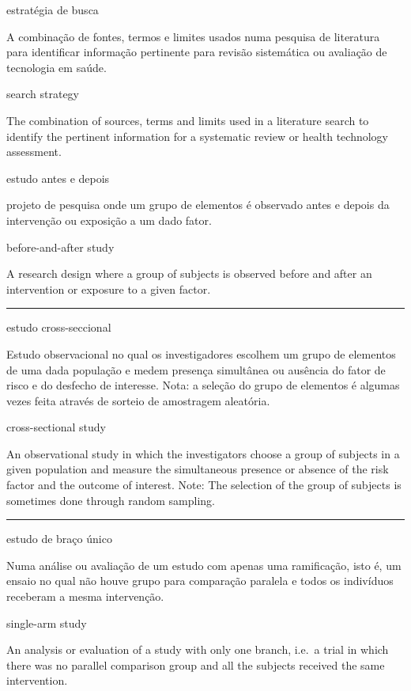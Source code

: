 \documentclass[
]{book}
\begin{document}
estratégia de busca

A combinação de fontes, termos e limites usados numa pesquisa de literatura para identificar informação pertinente para revisão sistemática ou avaliação de tecnologia em saúde.

search strategy

The combination of sources, terms and limits used in a literature search to identify the pertinent information for a systematic review or health technology assessment.

estudo antes e depois

projeto de pesquisa onde um grupo de elementos é observado antes e depois da intervenção ou exposição a um dado fator.

before-and-after study

A research design where a group of subjects is observed before and after an intervention or exposure to a given factor.

\begin{center}\rule{0.5\linewidth}{0.5pt}\end{center}

estudo cross-seccional

Estudo observacional no qual os investigadores escolhem um grupo de elementos de uma dada população e medem presença simultânea ou ausência do fator de risco e do desfecho de interesse. Nota: a seleção do grupo de elementos é algumas vezes feita através de sorteio de amostragem aleatória.

cross-sectional study

An observational study in which the investigators choose a group of subjects in a given population and measure the simultaneous presence or absence of the risk factor and the outcome of interest. Note: The selection of the group of subjects is sometimes done through random sampling.

\begin{center}\rule{0.5\linewidth}{0.5pt}\end{center}

estudo de braço único

Numa análise ou avaliação de um estudo com apenas uma ramificação, isto é, um ensaio no qual não houve grupo para comparação paralela e todos os indivíduos receberam a mesma intervenção.

single-arm study

An analysis or evaluation of a study with only one branch, i.e.~a trial in which there was no parallel comparison group and all the subjects received the same intervention.
\end{document}
